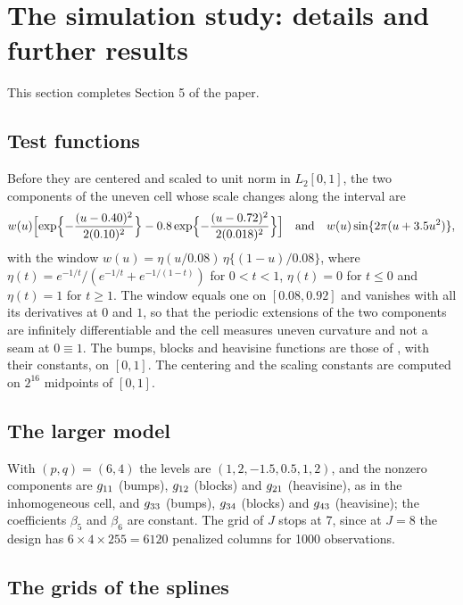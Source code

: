 \section{The simulation study: details and further results}
\label{sec:supp-sim}

This section completes Section 5 of the paper.

\subsection*{Test functions}

Before they are centered and scaled to unit norm in $L_2[0,1]$, the two
components of the uneven cell whose scale changes along the interval are
\[
  w(u)\Bigl[\exp\Bigl\{-\frac{(u-0.40)^{2}}{2(0.10)^{2}}\Bigr\}
  - 0.8\exp\Bigl\{-\frac{(u-0.72)^{2}}{2(0.018)^{2}}\Bigr\}\Bigr]
  \quad\text{and}\quad
  w(u)\sin\{2\pi(u + 3.5u^{2})\},
\]
with the window $w(u) = \eta(u/0.08)\,\eta\{(1-u)/0.08\}$, where
$\eta(t) = e^{-1/t}/(e^{-1/t} + e^{-1/(1-t)})$ for $0 < t < 1$,
$\eta(t) = 0$ for $t \le 0$ and $\eta(t) = 1$ for $t \ge 1$. The window equals
one on $[0.08, 0.92]$ and vanishes with all its derivatives at $0$ and $1$, so
that the periodic extensions of the two components are infinitely
differentiable and the cell measures uneven curvature and not a seam at
$0 \equiv 1$. The bumps, blocks and heavisine functions are those of
\citet{Donoho-Johnstone-1994}, with their constants, on $[0,1]$. The
centering and the scaling constants are computed on $2^{16}$ midpoints of
$[0,1]$.

\subsection*{The larger model}

With $(p,q) = (6,4)$ the levels are $(1, 2, -1.5, 0.5, 1, 2)$, and the
nonzero components are $g_{11}$ (bumps), $g_{12}$ (blocks) and
$g_{21}$ (heavisine), as in the inhomogeneous cell, and
$g_{33}$ (bumps), $g_{34}$ (blocks) and $g_{43}$
(heavisine); the coefficients $\beta_5$ and $\beta_6$ are constant. The grid
of $J$ stops at 7, since at $J = 8$ the design has $6 \times 4 \times 255 =
6120$ penalized columns for 1000 observations.

\subsection*{The grids of the splines}

